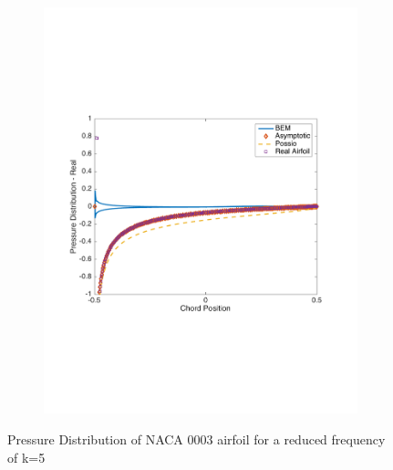 \documentclass{article}
\begin{document}
\begin{figure}[h]
\begin{subfigure}{0.33\textwidth}
	\includegraphics[width = \textwidth, height=0.16\textheight]{NACA0003_pressure_k5real}
\end{subfigure}%
\caption{Pressure Distribution of NACA 0003 airfoil for a reduced frequency of k=5}
\end{figure}
\end{document}
